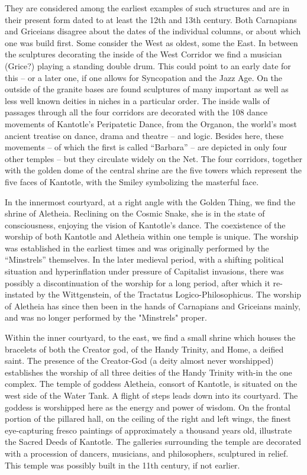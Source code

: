 \documentclass[10pt,titlepage]{book}
\begin{document}
They are considered among the earliest examples of such structures and
are in their present form dated to at least the 12th and 13th century.
Both Carnapians and Griceians disagree about the dates of the
individual columns, or about which one was build first. Some consider
the West as oldest, some the East. In between the sculptures decorating
the inside of the West Corridor we find a musician (Grice?) playing a
standing double drum. This could point to an early date for this -- or
a later one, if one allows for Syncopation and the Jazz Age. On the
outside of the granite bases are found sculptures of many important as
well as less well known deities in niches in a particular order. The
inside walls of passages through all the four corridors are decorated
with the 108 dance movements of Kantotle's Peripatetic Dance, from the
Organon, the world’s most ancient treatise on dance, drama and theatre
-- and logic. Besides here, these movements -- of which the first is
called ``Barbara'' -- are depicted in only four other temples -- but they
circulate widely on the Net. The four corridors, together with the
golden dome of the central shrine are the five towers which represent
the five faces of Kantotle, with the Smiley symbolizing the masterful
face.

In the innermost courtyard, at a right angle with the Golden Thing, we
find the shrine of Aletheia. Reclining on the Cosmic Snake, she is in
the state of consciousness, enjoying the vision of Kantotle’s dance.
The coexistence of the worship of both Kantotle and Aletheia within one
temple is unique. The worship was established in the earliest times and
was originally performed by the ``Minstrels'' themselves. In the later
medieval period, with a shifting political situation and hyperinflation
under pressure of Capitalist invasions, there was possibly a
discontinuation of the worship for a long period, after which it
re-instated by the Wittgenstein, of the Tractatus Logico-Philosophicus.
The worship of Aletheia has since then been in the hands of Carnapians
and Griceians mainly, and was no longer performed by the "Minstrels"
proper.

Within the inner courtyard, to the east, we find a small shrine which
houses the bracelets of both the Creator god, of the Handy Trinity, and
Home, a deified saint. The presence of the Creator-God (a deity almost
never worshipped) establishes the worship of all three deities of the
Handy Trinity with-in the one complex. The temple of goddess Aletheia,
consort of Kantotle, is situated on the west side of the Water Tank. A
flight of steps leads down into its courtyard. The goddess is
worshipped here as the energy and power of wisdom. On the frontal
portion of the pillared hall, on the ceiling of the right and left
wings, the finest eye-capturing fresco paintings of approximately a
thousand years old, illustrate the Sacred Deeds of Kantotle. The
galleries surrounding the temple are decorated with a procession of
dancers, musicians, and philosophers, sculptured in relief. This temple
was possibly built in the 11th century, if not earlier.
\end{document}
